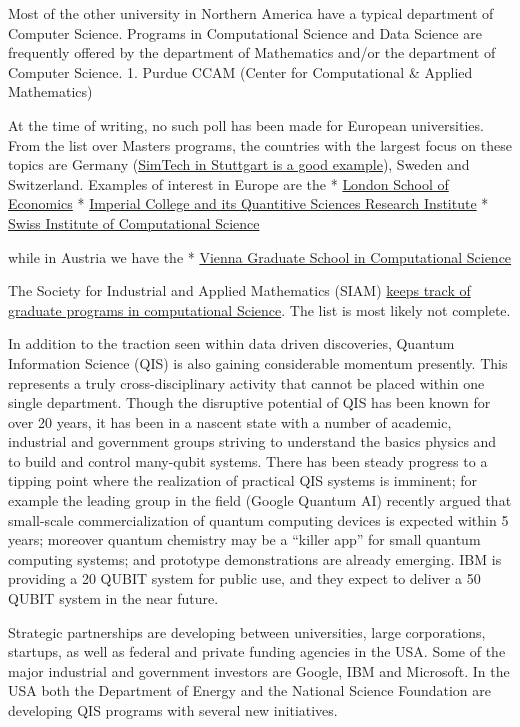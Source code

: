 \documentclass[]{article}
\begin{document}
Most of the other university in Northern America have a typical
department of Computer Science. Programs in Computational Science and
Data Science are frequently offered by the department of Mathematics
and/or the department of Computer Science. 1. Purdue CCAM (Center for
Computational \& Applied Mathematics)

At the time of writing, no such poll has been made for European
universities. From the list over Masters programs, the countries with
the largest focus on these topics are Germany
(\href{http://www.simtech.uni-stuttgart.de/}{SimTech in Stuttgart is a
good example}), Sweden and Switzerland. Examples of interest in Europe
are the * \href{http://www.lse.ac.uk/seds/}{London School of Economics}
*
\href{http://www.imperial.ac.uk/quantitative-sciences-institute/about}{Imperial
College and its Quantitive Sciences Research Institute} *
\href{https://www.ics.usi.ch/}{Swiss Institute of Computational Science}

while in Austria we have the *
\href{http://www.csc.univie.ac.at/ik/}{Vienna Graduate School in
Computational Science}

The Society for Industrial and Applied Mathematics (SIAM)
\href{https://www.siam.org/students/resources/cse_programs.php}{keeps
track of graduate programs in computational Science}. The list is most
likely not complete.

In addition to the traction seen within data driven discoveries, Quantum
Information Science (QIS) is also gaining considerable momentum
presently. This represents a truly cross-disciplinary activity that
cannot be placed within one single department. Though the disruptive
potential of QIS has been known for over 20 years, it has been in a
nascent state with a number of academic, industrial and government
groups striving to understand the basics physics and to build and
control many-qubit systems. There has been steady progress to a tipping
point where the realization of practical QIS systems is imminent; for
example the leading group in the field (Google Quantum AI) recently
argued that small-scale commercialization of quantum computing devices
is expected within 5 years; moreover quantum chemistry may be a ``killer
app'' for small quantum computing systems; and prototype demonstrations
are already emerging. IBM is providing a 20 QUBIT system for public use,
and they expect to deliver a 50 QUBIT system in the near future.

Strategic partnerships are developing between universities, large
corporations, startups, as well as federal and private funding agencies
in the USA. Some of the major industrial and government investors are
Google, IBM and Microsoft. In the USA both the Department of Energy and
the National Science Foundation are developing QIS programs with several
new initiatives.
\end{document}
